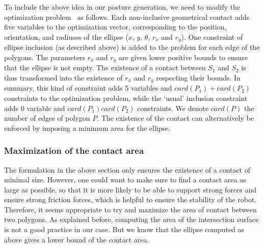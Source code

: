 
To include the above idea in our posture generation, we need to modify the optimization problem~ as follows.
Each non-inclusive geometrical contact adds five variables to the optimization vector, corresponding to the position, orientation, and radiuses of the ellipse ($x$, $y$, $\theta$, $r_x$ and $r_y$).
One constraint of ellipse inclusion (as described above) is added to the problem for each edge of the polygons.
The parameters $r_x$ and $r_y$ are given lower positive bounds to ensure that the ellipse is not empty.
The existence of a contact between $S_1$ and $S_2$ is thus transformed into the existence of $r_x$ and $r_y$ respecting their bounds.
In summary, this kind of constraint adds 5 variables and $card(P_1)+card(P_2)$ constraints to the optimization problem, while the `usual' inclusion constraint adds 0 variable and $card(P_1)card(P_2)$ constraints.
We denote $card(P)$ the number of edges of polygon $P$.
The existence of the contact can alternatively be enforced by imposing a minimum area for the ellipse.



\subsubsection{Maximization of the contact area}
\label{subsubsec:optim-ellipse-area}


The formulation in the above section only ensures the existence of a contact of minimal size.
However, one could want to make sure to find a contact area as large as possible, so that it is more likely to be able to support strong forces and ensure strong friction forces, which is helpful to ensure the stability of the robot.
Therefore, it seems appropriate to try and maximize the area of contact between two polygons.
As explained before, computing the area of the intersection surface is not a good practice in our case.
But we know that the ellipse computed as above gives a lower bound of the contact area.

